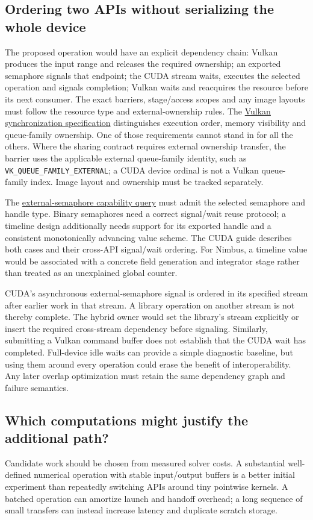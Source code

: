 \subsection{Ordering two APIs without serializing the whole device}
The proposed operation would have an explicit dependency chain: Vulkan produces
the input range and releases the required ownership; an exported semaphore
signals that endpoint; the CUDA stream waits, executes the selected operation
and signals completion; Vulkan waits and reacquires the resource before its
next consumer. The exact barriers, stage/access scopes and any image layouts
must follow the resource type and external-ownership rules. The
\href{https://docs.vulkan.org/spec/latest/chapters/synchronization.html}{Vulkan synchronization specification}
distinguishes execution order, memory visibility and queue-family ownership.
One of those requirements cannot stand in for all the others.
Where the sharing contract requires external ownership transfer, the barrier
uses the applicable external queue-family identity, such as
\texttt{VK\_QUEUE\_FAMILY\_EXTERNAL}; a CUDA device ordinal is not a Vulkan
queue-family index. Image layout and ownership must be tracked separately.

The
\href{https://docs.vulkan.org/refpages/latest/refpages/source/VkExternalSemaphoreProperties.html}{external-semaphore capability query}
must admit the selected semaphore and handle type. Binary semaphores need a
correct signal/wait reuse protocol; a timeline design additionally needs support
for its exported handle and a consistent monotonically advancing value scheme.
The CUDA guide describes both cases and their cross-API signal/wait ordering.
For Nimbus, a timeline value would be associated with a concrete field generation
and integrator stage rather than treated as an unexplained global counter.

CUDA's asynchronous external-semaphore signal is ordered in its specified
stream after earlier work in that stream. A library operation on another
stream is not thereby complete. The hybrid owner would set the library's stream
explicitly or insert the required cross-stream dependency before signaling.
Similarly, submitting a Vulkan command buffer does not establish that the
CUDA wait has completed. Full-device idle waits can provide a simple diagnostic
baseline, but using them around every operation could erase the benefit of
interoperability. Any later overlap optimization must retain the same dependency
graph and failure semantics.

\subsection{Which computations might justify the additional path?}
Candidate work should be chosen from measured solver costs. A substantial
well-defined numerical operation with stable input/output buffers is a better
initial experiment than repeatedly switching APIs around tiny pointwise kernels.
A batched operation can amortize launch and handoff overhead; a long sequence
of small transfers can instead increase latency and duplicate scratch storage.

